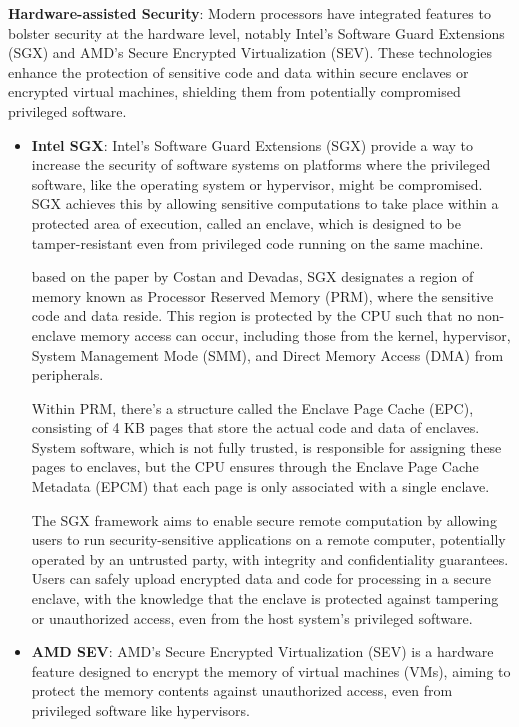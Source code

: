 \textbf{Hardware-assisted Security}: Modern processors have integrated features to bolster security at the hardware level, notably Intel's Software Guard Extensions (SGX)\cite{costanIntelSGXExplained2016} and AMD's Secure Encrypted Virtualization (SEV)\cite{mofradComparisonStudyIntel2018}. These technologies enhance the protection of sensitive code and data within secure enclaves or encrypted virtual machines, shielding them from potentially compromised privileged software.

\begin{itemize}
\item
  \textbf{Intel SGX}: Intel's Software Guard Extensions (SGX) provide a way to increase the security of software systems on platforms where the privileged software, like the operating system or hypervisor, might be compromised. SGX achieves this by allowing sensitive computations to take place within a protected area of execution, called an enclave, which is designed to be tamper-resistant even from privileged code running on the same machine.

  based on the paper by Costan and Devadas\cite{costanIntelSGXExplained2016}, SGX designates a region of memory known as Processor Reserved Memory (PRM), where the sensitive code and data reside. This region is protected by the CPU such that no non-enclave memory access can occur, including those from the kernel, hypervisor, System Management Mode (SMM), and Direct Memory Access (DMA) from peripherals.

  Within PRM, there's a structure called the Enclave Page Cache (EPC), consisting of 4 KB pages that store the actual code and data of enclaves. System software, which is not fully trusted, is responsible for assigning these pages to enclaves, but the CPU ensures through the Enclave Page Cache Metadata (EPCM) that each page is only associated with a single enclave.

  The SGX framework aims to enable secure remote computation by allowing users to run security-sensitive applications on a remote computer, potentially operated by an untrusted party, with integrity and confidentiality guarantees. Users can safely upload encrypted data and code for processing in a secure enclave, with the knowledge that the enclave is protected against tampering or unauthorized access, even from the host system's privileged software.

\item
  \textbf{AMD SEV}: AMD's Secure Encrypted Virtualization (SEV) is a hardware feature designed to encrypt the memory of virtual machines (VMs), aiming to protect the memory contents against unauthorized access, even from privileged software like hypervisors.


\end{itemize}
